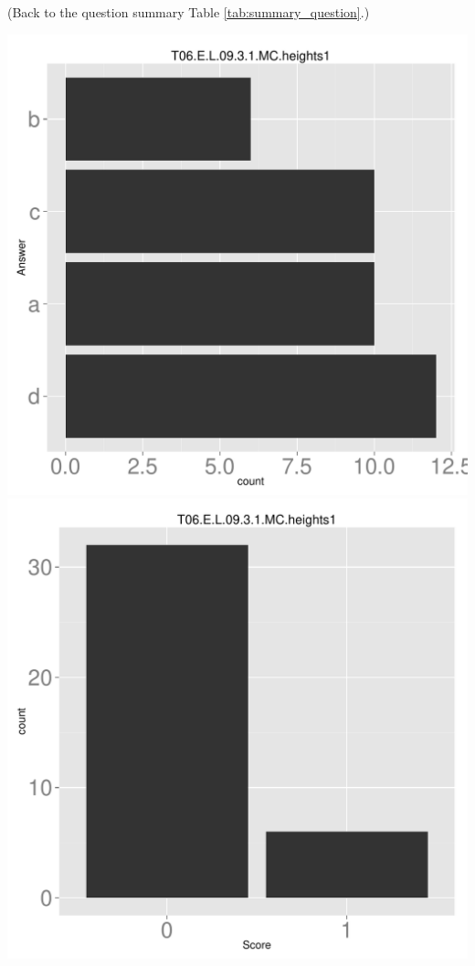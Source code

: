 \documentclass[12pt,nohyper]{tufte-handout}\usepackage[]{graphicx}\usepackage[]{color}
\begin{document}
 (Back to the question summary Table \ref{tab:summary_question}.)

\begin{center} \includegraphics[width=.45\linewidth]{Topic06_36_answer} \includegraphics[width=.45\linewidth]{Topic06_36_score} \end{center} 
\end{document}

